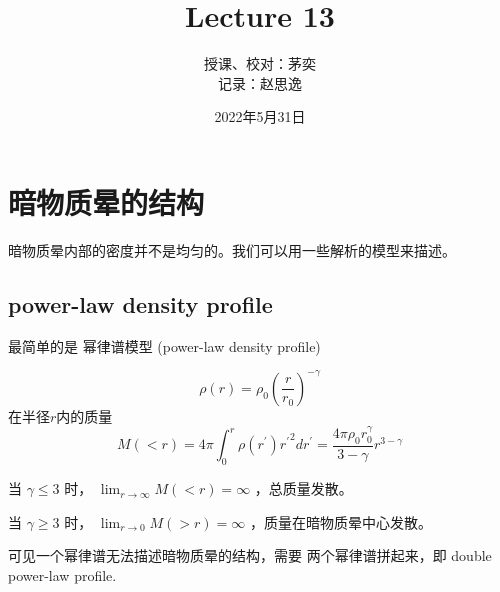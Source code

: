 \documentclass[12pt]{ctexart}
\title{Lecture 13}
\author{授课、校对：茅奕  \\ 记录：赵思逸}
\date{2022年5月31日}
\begin{document}
\maketitle

\section{暗物质晕的结构}

暗物质晕内部的密度并不是均匀的。我们可以用一些解析的模型来描述。

\subsection{power-law density profile}

最简单的是 幂律谱模型 (power-law density profile)

\begin{equation}
    \rho(r)=\rho_{0}\left(\frac{r}{r_{0}}\right)^{-\gamma}
\end{equation}
在半径$r$内的质量
\begin{equation}
    M(<r)=4 \pi \int_{0}^{r} \rho\left(r^{\prime}\right){r^{\prime}}^{2} d r^{\prime}=\frac{4 \pi \rho_{0} r_{0}^{\gamma}}{3-\gamma} r^{3-\gamma}
\end{equation}

当 $\gamma \leq 3$ 时， $\lim _{r \rightarrow \infty} M(<r)=\infty$ ，总质量发散。

当 $\gamma \geq 3$ 时， $\lim_{r \rightarrow 0} M(>r)=\infty$ ，质量在暗物质晕中心发散。 

可见一个幂律谱无法描述暗物质晕的结构，需要 两个幂律谱拼起来，即 double power-law profile.
\end{document}
